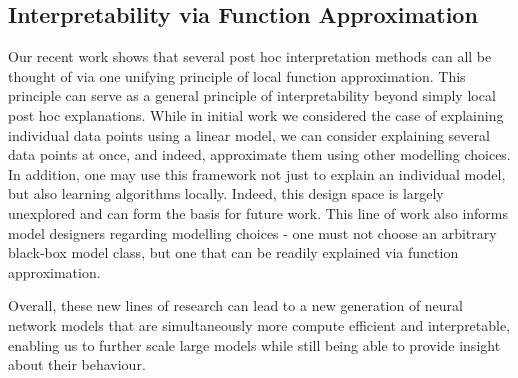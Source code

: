 \documentclass{article}
\renewcommand{\cite}{\citep}
\begin{document}
\subsection*{Interpretability via Function Approximation}
Our recent work \cite{han2022which} shows that several post hoc interpretation methods can all be thought of via one unifying principle of local function approximation. This principle can serve as a general principle of interpretability beyond simply local post hoc explanations. While in initial work \cite{han2022which} we considered the case of explaining individual data points using a linear model, we can consider explaining several data points at once, and indeed, approximate them using other modelling choices. In addition, one may use this framework not just to explain an individual model, but also learning algorithms locally. Indeed, this design space is largely unexplored and can form the basis for future work. This line of work also informs model designers regarding modelling choices - one must not choose an arbitrary black-box model class, but one that can be readily explained via function approximation.

\vspace*{0.5cm}
\noindent Overall, these new lines of research can lead to a new generation of neural network models that are simultaneously more compute efficient and interpretable, enabling us to further scale large models while still being able to provide insight about their behaviour.



\end{document}
